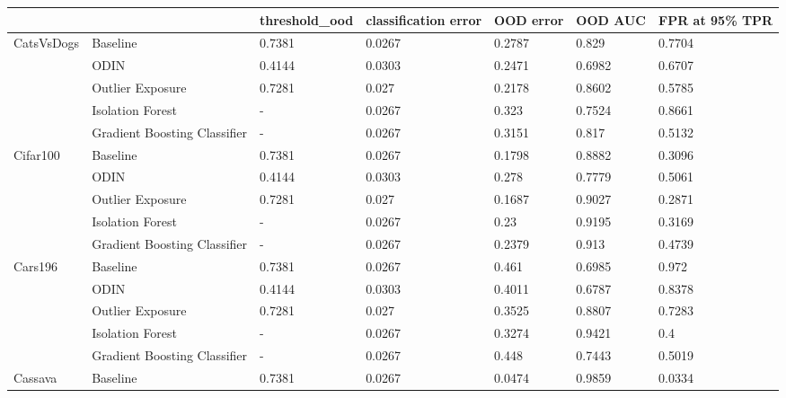 \begin{tabular}{lllllll}
\toprule
            &                              & threshold\_ood & classification error & OOD error & OOD AUC & FPR at 95\% TPR \\
\midrule
CatsVsDogs & Baseline &        0.7381 &               0.0267 &    0.2787 &   0.829 &         0.7704 \\
            & ODIN &        0.4144 &               0.0303 &    0.2471 &  0.6982 &         0.6707 \\
            & Outlier Exposure &        0.7281 &                0.027 &    0.2178 &  0.8602 &         0.5785 \\
            & Isolation Forest &             - &               0.0267 &     0.323 &  0.7524 &         0.8661 \\
            & Gradient Boosting Classifier &             - &               0.0267 &    0.3151 &   0.817 &         0.5132 \\
Cifar100 & Baseline &        0.7381 &               0.0267 &    0.1798 &  0.8882 &         0.3096 \\
            & ODIN &        0.4144 &               0.0303 &     0.278 &  0.7779 &         0.5061 \\
            & Outlier Exposure &        0.7281 &                0.027 &    0.1687 &  0.9027 &         0.2871 \\
            & Isolation Forest &             - &               0.0267 &      0.23 &  0.9195 &         0.3169 \\
            & Gradient Boosting Classifier &             - &               0.0267 &    0.2379 &   0.913 &         0.4739 \\
Cars196 & Baseline &        0.7381 &               0.0267 &     0.461 &  0.6985 &          0.972 \\
            & ODIN &        0.4144 &               0.0303 &    0.4011 &  0.6787 &         0.8378 \\
            & Outlier Exposure &        0.7281 &                0.027 &    0.3525 &  0.8807 &         0.7283 \\
            & Isolation Forest &             - &               0.0267 &    0.3274 &  0.9421 &            0.4 \\
            & Gradient Boosting Classifier &             - &               0.0267 &     0.448 &  0.7443 &         0.5019 \\
Cassava & Baseline &        0.7381 &               0.0267 &    0.0474 &  0.9859 &         0.0334 \\

\end{tabular}
